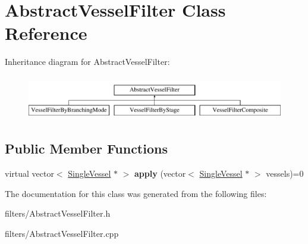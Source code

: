 \hypertarget{class_abstract_vessel_filter}{}\section{Abstract\+Vessel\+Filter Class Reference}
\label{class_abstract_vessel_filter}
Inheritance diagram for Abstract\+Vessel\+Filter\+:\begin{figure}[H]
\begin{center}
\leavevmode
\includegraphics[height=1.944445cm]{d7/d7f/class_abstract_vessel_filter}
\end{center}
\end{figure}
\subsection*{Public Member Functions}
\begin{DoxyCompactItemize}
\item 
virtual vector$<$ \hyperlink{class_single_vessel}{Single\+Vessel} $\ast$ $>$ {\bfseries apply} (vector$<$ \hyperlink{class_single_vessel}{Single\+Vessel} $\ast$ $>$ vessels)=0\hypertarget{class_abstract_vessel_filter_ad73645d238d0eb0164897e8db7e211e7}{}\label{class_abstract_vessel_filter_ad73645d238d0eb0164897e8db7e211e7}

\end{DoxyCompactItemize}


The documentation for this class was generated from the following files\+:\begin{DoxyCompactItemize}
\item 
filters/Abstract\+Vessel\+Filter.\+h\item 
filters/Abstract\+Vessel\+Filter.\+cpp\end{DoxyCompactItemize}
